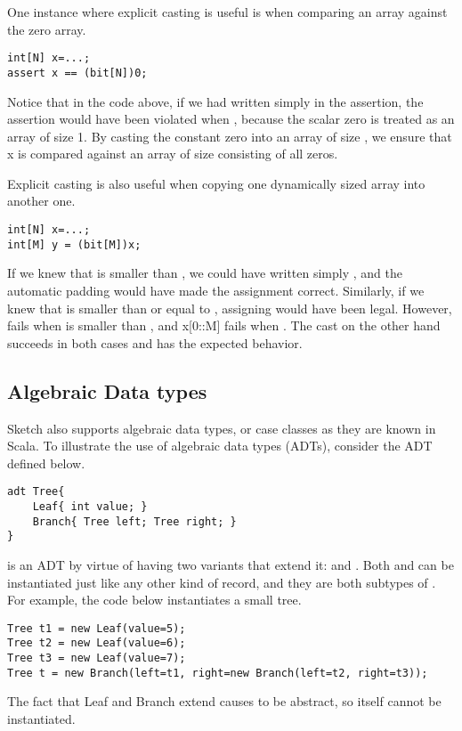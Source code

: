 \begin{Example}
One instance where explicit casting is useful is when comparing an array against the zero array.
\begin{lstlisting}
int[N] x=...;
assert x == (bit[N])0;
\end{lstlisting}
Notice that in the code above, if we had written simply  in the assertion, the assertion would have been violated when , because the scalar zero is treated as an array of size 1. By casting the constant zero into an array of size , we ensure that x is compared against an array of size  consisting of all zeros.
\end{Example}

\begin{Example}
Explicit casting is also useful when copying one dynamically sized array into another one.
\begin{lstlisting}
int[N] x=...;
int[M] y = (bit[M])x;
\end{lstlisting}
If we knew that  is smaller than , we could have written simply , and the automatic padding would have made the assignment correct. Similarly, if we knew that  is smaller than or equal to , assigning  would have been legal. However,  fails when  is smaller than , and x[0::M] fails when . The cast on the other hand succeeds in both cases and has the expected behavior.
\end{Example}



\subsection{Algebraic Data types}
Sketch also supports algebraic data types, or case classes as they are known in Scala. To illustrate the use of algebraic data types (ADTs), consider the  ADT defined below.
\begin{lstlisting}
adt Tree{
    Leaf{ int value; }
    Branch{ Tree left; Tree right; }
}
\end{lstlisting}
 is an ADT by virtue of having two variants that extend it:  and . Both  and  can be instantiated just like any other kind of record, and they are both subtypes of . For example, the code below instantiates a small tree.

\begin{lstlisting}
Tree t1 = new Leaf(value=5);
Tree t2 = new Leaf(value=6);
Tree t3 = new Leaf(value=7);
Tree t = new Branch(left=t1, right=new Branch(left=t2, right=t3));
\end{lstlisting}
The fact that Leaf and Branch extend  causes  to be abstract, so  itself cannot be instantiated.

